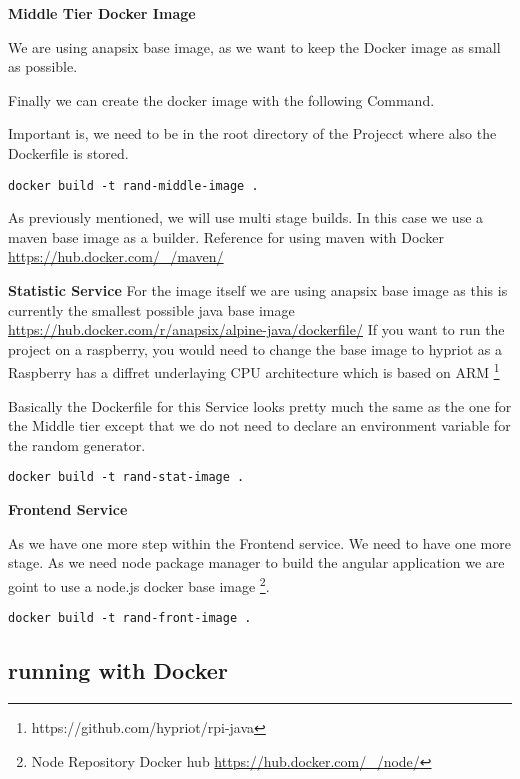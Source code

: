 \textbf{Middle Tier Docker Image}


We are using anapsix base image, as we want to keep the Docker image as small as possible.

Finally we can create the docker image with the following Command.

Important is, we need to be in the root directory of the Projecct where also the Dockerfile is stored.
\begin{verbatim}
docker build -t rand-middle-image .
\end{verbatim}
As previously mentioned, we will use multi stage builds. In this case we use a maven base image as a builder.
Reference for using maven with Docker \url{https://hub.docker.com/_/maven/}

\textbf{Statistic Service}
For the image itself we are using anapsix base image as this is currently the smallest possible java base image \url{https://hub.docker.com/r/anapsix/alpine-java/dockerfile/}
If you want to run the project on a raspberry, you would need to change the base image to hypriot as a Raspberry has a diffret underlaying CPU architecture which is based on ARM \footnote{https://github.com/hypriot/rpi-java}



Basically the Dockerfile for this Service looks pretty much the same as the one for the Middle tier except that we do not need to declare an environment variable for the random generator.

\begin{verbatim}
docker build -t rand-stat-image .
\end{verbatim}

\textbf{Frontend Service}

As we have one more step within the Frontend service. We need to have one more stage. As we need node package manager to build the angular application we are goint to use a node.js docker base image \footnote{ Node Repository Docker hub \url{https://hub.docker.com/_/node/}}.




\begin{verbatim}
docker build -t rand-front-image .
\end{verbatim}


\subsection{running with Docker}

